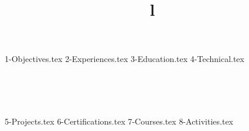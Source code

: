 \documentclass[margin]{res}
\begin{document}
\address{
\\\url{Github : https://www.github.com/louiszhenyean}
\\\url{Hackthebox : https://www.hackthebox.eu/profile/223593}
\\}
\address{
\\louiszhenyean@gmail.com
\\(+60) 19-567 5808 \\ \\}

\begin{resume}
{1-Objectives.tex}
{2-Experiences.tex}
{3-Education.tex}
{4-Technical.tex}
\begin{format}
\title{l}\\
\\
\body\\
\end{format}
{5-Projects.tex}
{6-Certifications.tex}
{7-Courses.tex}
{8-Activities.tex}
\end{resume}
\(\)
\end{document}
